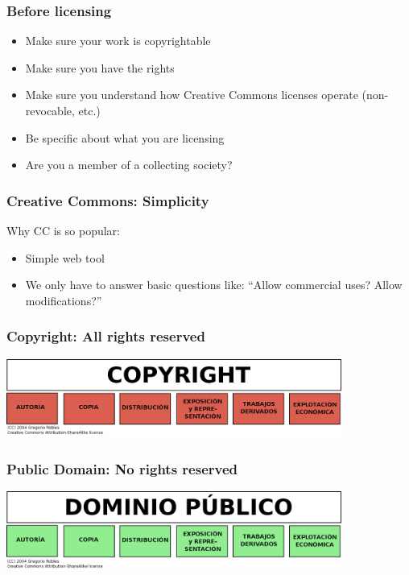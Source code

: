 
\begin{frame}
\frametitle{Before licensing}


\begin{itemize}
\item Make sure your work is copyrightable
\item Make sure you have the rights
\item Make sure you understand how Creative Commons licenses operate (non-revocable, etc.)
\item Be specific about what you are licensing
\item Are you a member of a collecting society? 
\end{itemize}

\end{frame}



\begin{frame}
\frametitle{Creative Commons: Simplicity}

Why CC is so popular:

\begin{itemize}
\item Simple web tool
\item We only have to answer basic questions like: ``Allow commercial uses? Allow modifications?''
\end{itemize}

\end{frame}



\begin{frame}
\frametitle{Copyright: All rights reserved}

\includegraphics[width=11cm]{figs/Copyright.png}

\end{frame}


\begin{frame}
\frametitle{Public Domain: No rights reserved}

\includegraphics[width=11cm]{figs/DominioPublico.png}

\end{frame}

